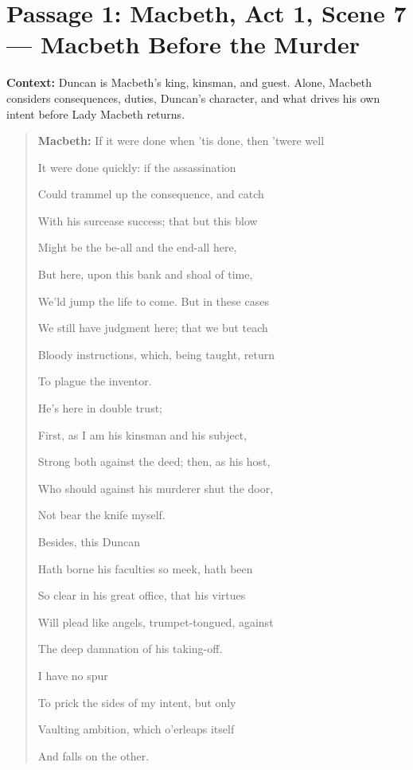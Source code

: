 \documentclass[11pt]{article}
\newenvironment{playpassage}{\begin{quote}\small\setlength{\parskip}{0.04em}\setlength{\parindent}{0pt}}{\end{quote}}
\newcommand{\speaker}[1]{\textbf{#1:}}
\begin{document}
\section*{Passage 1: Macbeth, Act 1, Scene 7 --- Macbeth Before the Murder}
\textbf{Context:} Duncan is Macbeth's king, kinsman, and guest. Alone, Macbeth considers consequences, duties, Duncan's character, and what drives his own intent before Lady Macbeth returns.
\begin{playpassage}
\speaker{Macbeth} If it were done when 'tis done, then 'twere well\par
It were done quickly: if the assassination\par
Could trammel up the consequence, and catch\par
With his surcease success; that but this blow\par
Might be the be-all and the end-all here,\par
But here, upon this bank and shoal of time,\par
We'ld jump the life to come. But in these cases\par
We still have judgment here; that we but teach\par
Bloody instructions, which, being taught, return\par
To plague the inventor.\par

He's here in double trust;\par
First, as I am his kinsman and his subject,\par
Strong both against the deed; then, as his host,\par
Who should against his murderer shut the door,\par
Not bear the knife myself.\par

Besides, this Duncan\par
Hath borne his faculties so meek, hath been\par
So clear in his great office, that his virtues\par
Will plead like angels, trumpet-tongued, against\par
The deep damnation of his taking-off.\par

I have no spur\par
To prick the sides of my intent, but only\par
Vaulting ambition, which o'erleaps itself\par
And falls on the other.
\end{playpassage}
\end{document}
